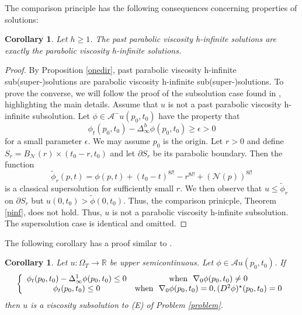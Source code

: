 \documentclass[12pt]{amsart}
\newtheorem{corollary}[thm]{Corollary}
\theoremstyle{definition}
\theoremstyle{remark}
\numberwithin{equation}{section}
\begin{document}
The comparison principle has the following consequences concerning properties of solutions: 
\begin{corollary}\label{h-infinite}
Let $h\geq 1$. 
The past parabolic viscosity h-infinite solutions are exactly the parabolic viscosity h-infinite solutions. 
\end{corollary}
\begin{proof}
By Proposition \ref{onedir}, past parabolic viscosity h-infinite sub(super-)solutions are parabolic viscosity h-infinite  sub(super-)solutions. To prove the converse, we will follow the proof of the subsolution case found in 
\cite{J:PD}, highlighting the main details.  Assume that $u$ is not a past parabolic viscosity h-infinite subsolution. 
Let $\phi \in \mathcal{A}^-u(p_0,t_0)$ have the property that 
$$\phi_t(p_0,t_0)-\Delta^h_\infty  \phi(p_0,t_0) \geq \epsilon > 0$$ for a small parameter $\epsilon$.  We may assume $p_0$ is the origin.
Let $r > 0$ and define $S_r= B_{\mathcal{N}}(r) \times (t_0-r,t_0)$ and let $\partial S_r$ be its parabolic boundary. Then the function $$\tilde{\phi}_r(p,t)= \phi(p,t)+(t_0-t)^{8l!}-r^{8l!}+(\mathcal{N}(p))^{8l!}$$ is a classical supersolution for sufficiently small $r$.  We then observe that $u \leq \tilde{\phi}_r$ on $\partial S_r$ but $u(0,t_0) > \tilde{\phi}(0,t_0)$. Thus, the comparison prinicple, Theorem \ref{pinf}, does not hold.  Thus, $u$ is not a parabolic viscosity h-infinite subsolution.  The supersolution case is identical and omitted. 
\end{proof}
The following corollary has a proof similar to \cite[Lemma 3.2]{JK:JK}. 
\begin{corollary}\label{moddef}
Let $u: \Omega_T \to \mathbb{R}$ be upper semicontinuous. Let $\phi\in \mathcal{A}u(p_0,t_0)$. If 
\begin{eqnarray}\label{modhyp}
\left\{\begin{array}{cc}
\phi_t(p_0,t_0)-\Delta^1_\infty \phi(p_0,t_0) \leq 0 & \textmd{when}\ \ \nabla_0 \phi(p_0,t_0) \neq 0 \\  
\phi_t(p_0,t_0) \leq 0 & \textmd{when}\ \ \nabla_0 \phi(p_0,t_0) = 0, (D^2\phi)^\star(p_0,t_0)=0
\end{array}\right.
\end{eqnarray}
then $u$	is a viscosity subsolution to (E) of Problem \eqref{problem}. 
\end{corollary}
\end{document}
